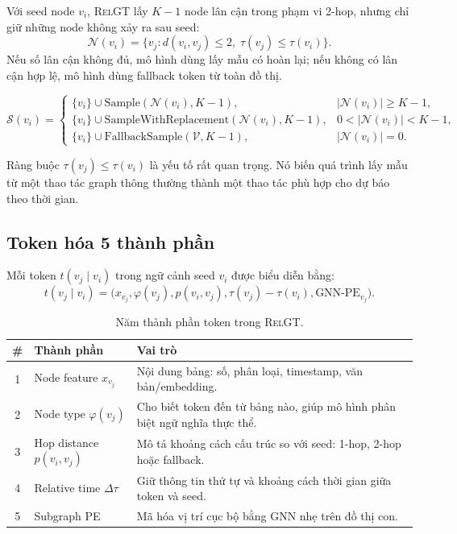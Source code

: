 \documentclass[12pt,a4paper]{article}
\newcommand{\RelGT}{\textsc{RelGT}}
\begin{document}
Với seed node $v_i$, \RelGT{} lấy $K-1$ node lân cận trong phạm vi 2-hop,
nhưng chỉ giữ những node không xảy ra sau seed:
\[
  \mathcal{N}(v_i)=
  \{v_j: d(v_i,v_j)\le 2,\; \tau(v_j)\le \tau(v_i)\}.
\]
Nếu số lân cận không đủ, mô hình dùng lấy mẫu có hoàn lại; nếu không có lân
cận hợp lệ, mô hình dùng fallback token từ toàn đồ thị.

\begin{mathbox}
\[
  \mathcal{S}(v_i)=
  \begin{cases}
    \{v_i\}\cup \text{Sample}(\mathcal{N}(v_i),K-1),
      & |\mathcal{N}(v_i)|\ge K-1,\\
    \{v_i\}\cup \text{SampleWithReplacement}(\mathcal{N}(v_i),K-1),
      & 0<|\mathcal{N}(v_i)|<K-1,\\
    \{v_i\}\cup \text{FallbackSample}(\mathcal{V},K-1),
      & |\mathcal{N}(v_i)|=0.
  \end{cases}
\]
\end{mathbox}

Ràng buộc $\tau(v_j)\le\tau(v_i)$ là yếu tố rất quan trọng. Nó biến quá trình
lấy mẫu từ một thao tác graph thông thường thành một thao tác phù hợp cho
dự báo theo thời gian.

\subsection{Token hóa 5 thành phần}

Mỗi token $t(v_j\mid v_i)$ trong ngữ cảnh seed $v_i$ được biểu diễn bằng:
\[
  t(v_j\mid v_i)=
  \bigl(x_{v_j},\varphi(v_j),p(v_i,v_j),
  \tau(v_j)-\tau(v_i),\text{GNN-PE}_{v_j}\bigr).
\]

\begin{table}[H]
\centering
\caption{Năm thành phần token trong \RelGT{}.}
\begin{tabularx}{\textwidth}{clX}
\toprule
\textbf{\#} & \textbf{Thành phần} & \textbf{Vai trò} \\
\midrule
1 & Node feature $x_{v_j}$ & Nội dung bảng: số, phân loại, timestamp, văn bản/embedding. \\
2 & Node type $\varphi(v_j)$ & Cho biết token đến từ bảng nào, giúp mô hình phân biệt ngữ nghĩa thực thể. \\
3 & Hop distance $p(v_i,v_j)$ & Mô tả khoảng cách cấu trúc so với seed: 1-hop, 2-hop hoặc fallback. \\
4 & Relative time $\Delta\tau$ & Giữ thông tin thứ tự và khoảng cách thời gian giữa token và seed. \\
5 & Subgraph PE & Mã hóa vị trí cục bộ bằng GNN nhẹ trên đồ thị con. \\
\bottomrule
\end{tabularx}
\end{table}
\end{document}
